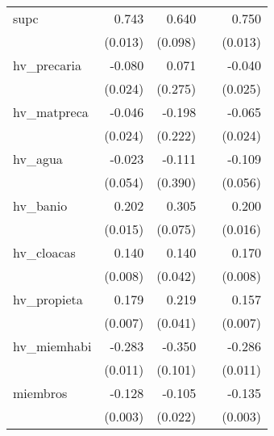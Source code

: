 {\begin{longtable}{l*{4}{D{.}{.}{-1}}}
\addlinespace
supc        &       0.743\sym{***}&       0.640\sym{***}&                     &       0.750\sym{***}\\
            &     (0.013)         &     (0.098)         &                     &     (0.013)         \\
\addlinespace
hv\_precaria &      -0.080\sym{***}&       0.071         &                     &      -0.040         \\
            &     (0.024)         &     (0.275)         &                     &     (0.025)         \\
\addlinespace
hv\_matpreca &      -0.046         &      -0.198         &                     &      -0.065\sym{**} \\
            &     (0.024)         &     (0.222)         &                     &     (0.024)         \\
\addlinespace
hv\_agua     &      -0.023         &      -0.111         &                     &      -0.109         \\
            &     (0.054)         &     (0.390)         &                     &     (0.056)         \\
\addlinespace
hv\_banio    &       0.202\sym{***}&       0.305\sym{***}&                     &       0.200\sym{***}\\
            &     (0.015)         &     (0.075)         &                     &     (0.016)         \\
\addlinespace
hv\_cloacas  &       0.140\sym{***}&       0.140\sym{***}&                     &       0.170\sym{***}\\
            &     (0.008)         &     (0.042)         &                     &     (0.008)         \\
\addlinespace
hv\_propieta &       0.179\sym{***}&       0.219\sym{***}&                     &       0.157\sym{***}\\
            &     (0.007)         &     (0.041)         &                     &     (0.007)         \\
\addlinespace
hv\_miemhabi &      -0.283\sym{***}&      -0.350\sym{***}&                     &      -0.286\sym{***}\\
            &     (0.011)         &     (0.101)         &                     &     (0.011)         \\
\addlinespace
miembros    &      -0.128\sym{***}&      -0.105\sym{***}&                     &      -0.135\sym{***}\\
            &     (0.003)         &     (0.022)         &                     &     (0.003)         \\

\end{longtable}}
